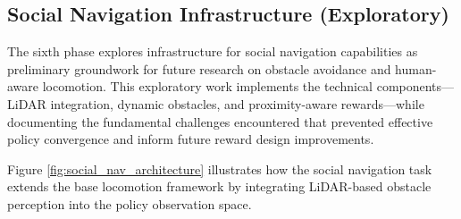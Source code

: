 \documentclass[12pt,a4paper]{article}
\begin{document}
\subsection{Social Navigation Infrastructure (Exploratory)}

The sixth phase explores infrastructure for social navigation capabilities as preliminary groundwork for future research on obstacle avoidance and human-aware locomotion. This exploratory work implements the technical components---LiDAR integration, dynamic obstacles, and proximity-aware rewards---while documenting the fundamental challenges encountered that prevented effective policy convergence and inform future reward design improvements.

Figure \ref{fig:social_nav_architecture} illustrates how the social navigation task extends the base locomotion framework by integrating LiDAR-based obstacle perception into the policy observation space.
\end{document}

